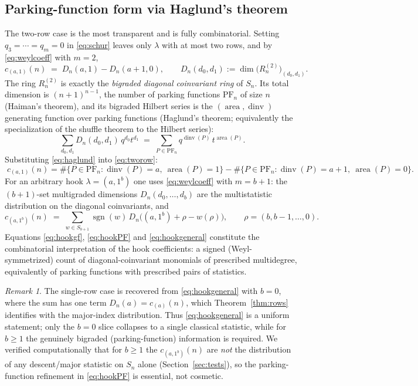 \documentclass[11pt]{article}
\theoremstyle{definition}
\theoremstyle{remark}
\newtheorem{remark}{Remark}
\newcommand{\area}{\operatorname{area}}
\newcommand{\dinv}{\operatorname{dinv}}
\newcommand{\PF}{\mathrm{PF}}
\newcommand{\sgn}{\operatorname{sgn}}
\begin{document}
\subsection{Parking-function form via Haglund's theorem}\label{ss:pf}
The two-row case is the most transparent and is fully combinatorial.  Setting
$q_3=\cdots=q_m=0$ in \eqref{eq:schur} leaves only $\lambda$ with at most two rows, and by
\eqref{eq:weylcoeff} with $m=2$,
\begin{equation}\label{eq:tworow}
c_{(a,1)}(n)\;=\;D_n(a,1)-D_n(a+1,0),
\qquad D_n(d_0,d_1):=\dim\bigl(R_n^{(2)}\bigr)_{(d_0,d_1)} .
\end{equation}
The ring $R_n^{(2)}$ is exactly the \emph{bigraded diagonal coinvariant ring} of $S_n$.  Its
total dimension is $(n+1)^{n-1}$, the number of parking functions $\PF_n$ of size $n$
(Haiman's theorem), and its bigraded Hilbert series is the $(\area,\dinv)$ generating function
over parking functions (Haglund's theorem; equivalently the specialization of the shuffle
theorem to the Hilbert series):
\begin{equation}\label{eq:haglund}
\sum_{d_0,d_1}D_n(d_0,d_1)\,q^{d_0}t^{d_1}
\;=\;\sum_{P\in\PF_n}q^{\dinv(P)}\,t^{\area(P)} .
\end{equation}
Substituting \eqref{eq:haglund} into \eqref{eq:tworow}:
\begin{equation}\label{eq:hookPF}
\boxed{\;
c_{(a,1)}(n)=\#\{P\in\PF_n:\dinv(P)=a,\ \area(P)=1\}
            -\#\{P\in\PF_n:\dinv(P)=a+1,\ \area(P)=0\}.\;}
\end{equation}
For an arbitrary hook $\lambda=(a,1^{b})$ one uses \eqref{eq:weylcoeff} with $m=b+1$: the
$(b+1)$-set multigraded dimensions $D_n(d_0,\dots,d_b)$ are the multistatistic distribution on
the diagonal coinvariants, and
\begin{equation}\label{eq:hookgeneral}
c_{(a,1^{b})}(n)\;=\;\sum_{w\in S_{b+1}}\sgn(w)\,
D_n\bigl((a,1^{b})+\rho-w(\rho)\bigr),
\qquad\rho=(b,b-1,\dots,0).
\end{equation}
Equations \eqref{eq:hookgf}, \eqref{eq:hookPF} and \eqref{eq:hookgeneral} constitute the
combinatorial interpretation of the hook coefficients: a signed (Weyl-symmetrized) count of
diagonal-coinvariant monomials of prescribed multidegree, equivalently of parking functions
with prescribed pairs of statistics.

\begin{remark}
The single-row case is recovered from \eqref{eq:hookgeneral} with $b=0$, where the sum has
one term $D_n(a)=c_{(a)}(n)$, which Theorem~\ref{thm:rows} identifies with the major-index
distribution.  Thus \eqref{eq:hookgeneral} is a uniform statement; only the $b=0$ slice
collapses to a single classical statistic, while for $b\ge 1$ the genuinely bigraded
(parking-function) information is required.  We verified computationally that for $b\ge1$ the
$c_{(a,1^b)}(n)$ are \emph{not} the distribution of any descent/major statistic on $S_n$
alone (Section~\ref{sec:tests}), so the parking-function refinement in \eqref{eq:hookPF} is
essential, not cosmetic.
\end{remark}
\end{document}
